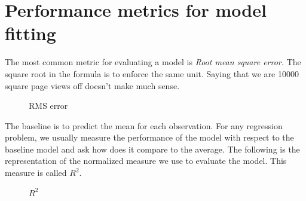 \documentclass{article}
\begin{document}
\section {Performance metrics for model fitting}
The most common metric for evaluating a model is \emph{Root mean square error.} The square root in the formula is to enforce the same unit. Saying that we are 10000 square page views off doesn't make much sense.
\begin{figure}[h]
\centering
\caption{RMS error}
{\setlength{\fboxsep}{20pt}
\setlength{\fboxrule}{1pt}
\textcolor{DarkBlue}{}
}
\end{figure} 

\newpage
The baseline is to predict the mean for each observation. For any regression problem, we usually measure the performance of the model with respect to the baseline model and ask how does it compare to the average.
The following is the representation of the normalized measure we use to evaluate the model. This measure is called $R^2$.

\begin{figure}[h]
\centering
\caption{$R^2$}
{\setlength{\fboxsep}{20pt}
\setlength{\fboxrule}{1pt}
\textcolor{cyan}{}
}
\end{figure} 
\end{document}
